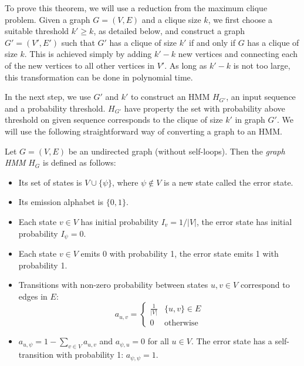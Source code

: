 To prove this theorem, we will use a reduction from the maximum clique
problem.  Given a graph $G=(V,E)$ and a clique
size $k$, we first choose a suitable threshold $k'\ge k$, as
detailed below, and construct a graph $G'=(V',E')$ such that $G'$ has
a clique of size $k'$ if and only if $G$ has a clique of size
$k$. This is achieved simply by adding $k'-k$ new vertices and
connecting each of the new vertices to all other vertices in $V'$.
As long as $k'-k$ is not too large, this transformation can be done in
polynomial time.

In the next step, we use $G'$ and $k'$ to construct an HMM $H_{G'}$, an input
sequence and a probability threshold. $H_{G'}$ have property the set with
probability above threshold on given sequence corresponds to the clique of size
$k'$ in graph $G'$. We will use the following
straightforward way of converting a graph to an HMM.

\begin{definition}\label{GraphHMM}
Let $G=(V,E)$ be an undirected graph (without self-loops). 
Then the \emph{graph HMM} $H_G$ is defined as follows:
\begin{itemize}
\item Its set of states is $V\cup \{\psi\}$, where $\psi\notin V$ is a
  new state called the error state.
\item Its emission alphabet is $\{0,1\}$.
\item Each state $v\in V$ has initial probability $I_{v} = 1/|V|$, the
error state has initial probability $I_{\psi}=0$.
\item Each state $v\in V$ emits 0 with probability 1, the error state emits 1 
with probability 1.
\item Transitions with non-zero probability between states $u,v\in V$
  correspond to edges in $E$:
$$a_{u,v}=\begin{cases}
\frac1{|V|} & \{u,v\}\in E\\
0 & \text{otherwise}
\end{cases}$$
\item $a_{u,\psi}=1-\sum_{v\in V}a_{u,v}$
and $a_{\psi,u}=0$ for all $u\in V$. The error state has a self-transition with
probability 1: $a_{\psi,\psi}=1$.
\end{itemize}
\end{definition}

